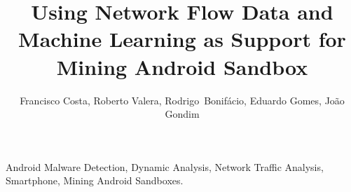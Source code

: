 \documentclass[10pt,journal,compsoc]{IEEEtran}
\begin{document}
\title{Using Network Flow Data and Machine Learning as Support for Mining Android Sandbox}


\author{Francisco Costa,
        Roberto Valera, 
        Rodrigo~Bonif\'{a}cio,
        Eduardo Gomes, 
        Jo\~{a}o Gondim
}









\maketitle
\begin{IEEEkeywords}
Android Malware Detection, Dynamic Analysis, Network Traffic Analysis, Smartphone, Mining Android Sandboxes.
\end{IEEEkeywords}








\balance 



\end{document}
